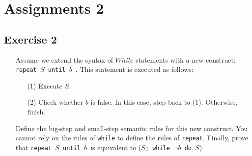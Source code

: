\documentclass{article}
\title{}
\date{}
\author{Rafael Fernández Ortiz}
\newcommand{\rep}{\texttt{repeat $S$ until $b$ }}
\newcommand{\whl}{\texttt{$S$; while $\neg b$ do $S$}}
\begin{document}
\maketitle

\section*{Assignments 2}
\subsection*{Exercise 2}
\begin{enumerate}
\item[] Assume we extend the syntax of $While$ statements with a new construct: \rep. This statement is executed as follows:
    \begin{enumerate}
        \item[(1)] Execute $S$.
        \item[(2)] Check whether $b$ is false. In this case, step back to (1). Otherwise, finish.
    \end{enumerate}
    Define the big-step and small-step semantic rules for this new construct. You cannot rely on the rules of \texttt{while} to define the rules of \texttt{repeat}. Finally, prove that \rep is equivalent to (\whl)
\end{enumerate}
\end{document}
